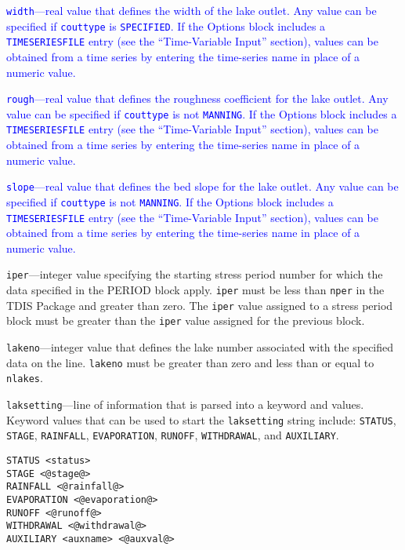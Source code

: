 \item \textcolor{blue}{\texttt{width}---real value that defines the width of the lake outlet. Any value can be specified if \texttt{couttype} is \texttt{SPECIFIED}. If the Options block includes a \texttt{TIMESERIESFILE} entry (see the ``Time-Variable Input'' section), values can be obtained from a time series by entering the time-series name in place of a numeric value.}

\item \textcolor{blue}{\texttt{rough}---real value that defines the roughness coefficient for the lake outlet. Any value can be specified if \texttt{couttype} is not \texttt{MANNING}. If the Options block includes a \texttt{TIMESERIESFILE} entry (see the ``Time-Variable Input'' section), values can be obtained from a time series by entering the time-series name in place of a numeric value.}

\item \textcolor{blue}{\texttt{slope}---real value that defines the bed slope for the lake outlet. Any value can be specified if \texttt{couttype} is not \texttt{MANNING}. If the Options block includes a \texttt{TIMESERIESFILE} entry (see the ``Time-Variable Input'' section), values can be obtained from a time series by entering the time-series name in place of a numeric value.}

\item \texttt{iper}---integer value specifying the starting stress period number for which the data specified in the PERIOD block apply.  \texttt{iper} must be less than \texttt{nper} in the TDIS Package and greater than zero.  The \texttt{iper} value assigned to a stress period block must be greater than the \texttt{iper} value assigned for the previous block.

\item \texttt{lakeno}---integer value that defines the lake number associated with the specified data on the line. \texttt{lakeno} must be greater than zero and less than or equal to \texttt{nlakes}.

\item \texttt{laksetting}---line of information that is parsed into a keyword and values.  Keyword values that can be used to start the \texttt{laksetting} string include: \texttt{STATUS}, \texttt{STAGE}, \texttt{RAINFALL}, \texttt{EVAPORATION}, \texttt{RUNOFF}, \texttt{WITHDRAWAL}, and \texttt{AUXILIARY}.

\begin{lstlisting}[style=blockdefinition]
STATUS <status>
STAGE <@stage@>
RAINFALL <@rainfall@>
EVAPORATION <@evaporation@>
RUNOFF <@runoff@>
WITHDRAWAL <@withdrawal@>
AUXILIARY <auxname> <@auxval@> 
\end{lstlisting}

